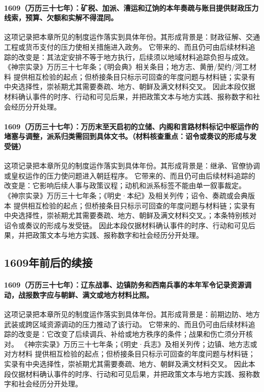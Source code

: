 \paragraph{1609（万历三十七年）：矿税、加派、漕运和辽饷的本年奏疏与账目提供财政压力线索，预算、欠额和实解不得混同。} 这项记录把本章所见的制度运作落实到具体年份。其形成背景是：财政征解、交通工程或货币支付的压力使相关措施进入政务。 它带来的、而且仍可由后续材料追踪的改变是：其法定安排不等于地方执行，后续须以地域材料追踪负担与成效。 《神宗实录》万历三十七年条；《明会典》相关条目；地方志、黄册/契约/河工材料 提供相互检验的起点；但桥接条目只标示可回查的年度问题与材料链；实录有中央选择性，崇祯期尤其需要奏疏、地方、朝鲜及满文材料交叉。 因此本段仅据材料确认事件的时序、行动和可见后果，并把政策文本与地方实践、报称数字和社会经历分开处理。

\paragraph{1609（万历三十七年）：万历末至天启初的立储、内阁和言路材料标记中枢运作的堵塞与调整，派系归类需回到具体文书。（材料核查重点：诏令或奏议的形成与发受链）} 这项记录把本章所见的制度运作落实到具体年份。其形成背景是：继承、官僚协调或皇权运作的压力使问题进入朝廷程序。 它带来的、而且仍可由后续材料追踪的改变是：它影响后续人事与政策议程；动机和派系标签不能由单一叙事裁定。 《神宗实录》万历三十七年条；《明史·本纪》及相关列传；诏令、奏疏或会典版本 提供相互检验的起点；但桥接条目只标示可回查的年度问题与材料链；实录有中央选择性，崇祯期尤其需要奏疏、地方、朝鲜及满文材料交叉。；本条特别核对诏令或奏议的形成与发受链。 因此本段仅据材料确认事件的时序、行动和可见后果，并把政策文本与地方实践、报称数字和社会经历分开处理。

\subsection{1609年前后的续接}

\paragraph{1609（万历三十七年）：辽东战事、边镇防务和西南兵事的本年军令记录资源调动，战报数字应与朝鲜、满文或地方材料比照。} 这项记录把本章所见的制度运作落实到具体年份。其形成背景是：前期边防、地方武装或跨区域资源调动的压力推动了该行动。 它带来的、而且仍可由后续材料追踪的改变是：它改变了后续调兵、补给或地方秩序的条件；战果和伤亡须分开核对。 《神宗实录》万历三十七年条；《明史·兵志》及相关列传；边镇、地方志或对方材料 提供相互检验的起点；但桥接条目只标示可回查的年度问题与材料链；实录有中央选择性，崇祯期尤其需要奏疏、地方、朝鲜及满文材料交叉。 因此本段仅据材料确认事件的时序、行动和可见后果，并把政策文本与地方实践、报称数字和社会经历分开处理。

